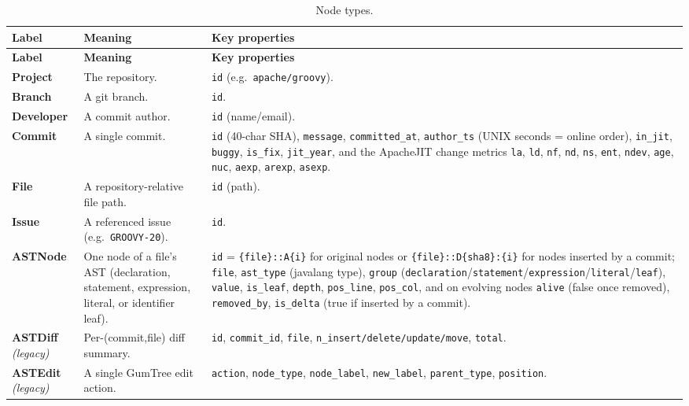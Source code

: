 \documentclass[11pt,a4paper]{article}
\newcommand{\code}[1]{\texttt{#1}}
\newcommand{\node}[1]{\textcolor{kgblue}{\textbf{#1}}}
\begin{document}
\begin{longtable}{@{}p{2.4cm}p{4.4cm}p{7.6cm}@{}}
\caption{Node types.}\label{tab:nodes}\\
\toprule
\textbf{Label} & \textbf{Meaning} & \textbf{Key properties}\\
\midrule
\endfirsthead
\toprule
\textbf{Label} & \textbf{Meaning} & \textbf{Key properties}\\
\midrule
\endhead
\node{Project} & The repository. & \code{id} (e.g.\ \texttt{apache/groovy}).\\
\addlinespace
\node{Branch} & A git branch. & \code{id}.\\
\addlinespace
\node{Developer} & A commit author. & \code{id} (name/email).\\
\addlinespace
\node{Commit} & A single commit. & \code{id} (40-char SHA), \code{message},
  \code{committed\_at}, \code{author\_ts} (UNIX seconds = online order),
  \code{in\_jit}, \code{buggy}, \code{is\_fix}, \code{jit\_year}, and the
  ApacheJIT change metrics \code{la}, \code{ld}, \code{nf}, \code{nd},
  \code{ns}, \code{ent}, \code{ndev}, \code{age}, \code{nuc}, \code{aexp},
  \code{arexp}, \code{asexp}.\\
\addlinespace
\node{File} & A repository-relative file path. & \code{id} (path).\\
\addlinespace
\node{Issue} & A referenced issue (e.g.\ \texttt{GROOVY-20}). & \code{id}.\\
\addlinespace
\node{ASTNode} & One node of a file's AST (declaration, statement, expression,
  literal, or identifier leaf). & \code{id} =
  \texttt{\{file\}::A\{i\}} for original nodes or
  \texttt{\{file\}::D\{sha8\}:\{i\}} for nodes inserted by a commit;
  \code{file}, \code{ast\_type} (javalang type), \code{group}
  (\texttt{declaration}/\texttt{statement}/\texttt{expression}/\texttt{literal}/\texttt{leaf}),
  \code{value}, \code{is\_leaf}, \code{depth}, \code{pos\_line},
  \code{pos\_col}, and on evolving nodes \code{alive} (false once removed),
  \code{removed\_by}, \code{is\_delta} (true if inserted by a commit).\\
\addlinespace
\node{ASTDiff} \emph{(legacy)} & Per-(commit,file) diff summary. &
  \code{id}, \code{commit\_id}, \code{file}, \code{n\_insert/delete/update/move},
  \code{total}.\\
\addlinespace
\node{ASTEdit} \emph{(legacy)} & A single GumTree edit action. &
  \code{action}, \code{node\_type}, \code{node\_label}, \code{new\_label},
  \code{parent\_type}, \code{position}.\\
\bottomrule
\end{longtable}
\end{document}
